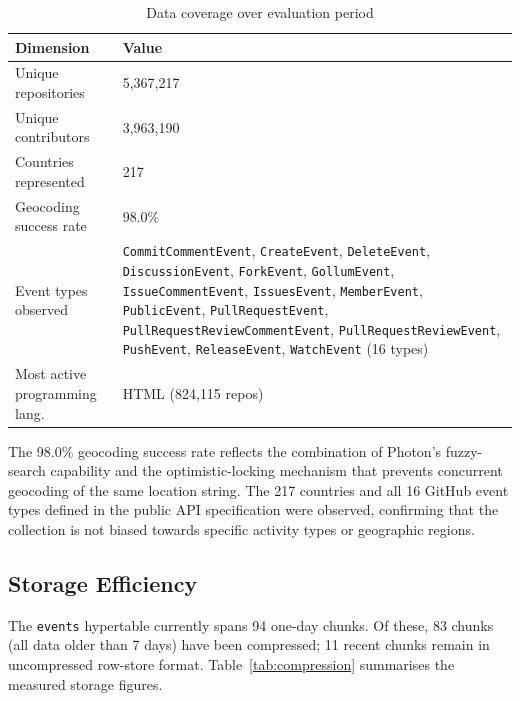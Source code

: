 \documentclass[sigconf]{acmart}
\begin{document}
\begin{table}[ht]
  \caption{Data coverage over evaluation period}
  \label{tab:coverage}
  \begin{tabularx}{\linewidth}{l L}
    \toprule
    \textbf{Dimension} & \textbf{Value} \\
    \midrule
    Unique repositories            & 5{,}367{,}217 \\
    Unique contributors            & 3{,}963{,}190 \\
    Countries represented          & 217 \\
    Geocoding success rate         & 98.0\% \\
    Event types observed           & {\footnotesize\texttt{CommitCommentEvent}, \texttt{CreateEvent}, \texttt{DeleteEvent}, \texttt{DiscussionEvent}, \texttt{ForkEvent}, \texttt{GollumEvent}, \texttt{IssueCommentEvent}, \texttt{IssuesEvent}, \texttt{MemberEvent}, \texttt{PublicEvent}, \texttt{PullRequestEvent}, \texttt{PullRequestReviewCommentEvent}, \texttt{PullRequestReviewEvent}, \texttt{PushEvent}, \texttt{ReleaseEvent}, \texttt{WatchEvent}} (16 types) \\
    Most active programming lang.  & HTML (824{,}115 repos) \\
    \bottomrule
  \end{tabularx}
\end{table}

The 98.0\% geocoding success rate reflects the combination of Photon's
fuzzy-search capability and the optimistic-locking mechanism that prevents
concurrent geocoding of the same location string. The 217 countries and all 16
GitHub event types defined in the public API specification were observed, confirming
that the collection is not biased towards specific activity types or geographic
regions.

\newpage
\subsection{Storage Efficiency}

The \texttt{events} hypertable currently spans 94 one-day chunks.
Of these, 83 chunks (all data older than 7 days) have been compressed;
11 recent chunks remain in uncompressed row-store format.
Table~\ref{tab:compression} summarises the measured storage figures.
\end{document}
